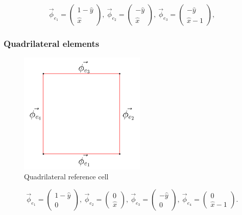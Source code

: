 \documentclass[14pt]{extarticle}
\numberwithin{equation}{section}    %
\newcommand{\phiv}{\vec \phi}
\begin{document}
\begin{equation}\label{eq:BasisFuncsTets}
    \phiv_{e_1} = \begin{pmatrix}
        1-\hat y\\ \hat x
    \end{pmatrix}, \  \phiv_{e_2} = \begin{pmatrix}
        -\hat y \\ \hat x
    \end{pmatrix}, \ \phiv_{e_3} = \begin{pmatrix}
        -\hat y\\ \hat x-1
    \end{pmatrix},
\end{equation}

\subsubsection{Quadrilateral elements}


\begin{figure}[h!]
\centering
\includegraphics[width=6cm]{GridFigure/basisFuncsQuads}
\caption{Quadrilateral reference cell}
\label{fig:quadBasis}
\end{figure}

\begin{equation}\label{eq:BasisFuncsQuads}
    \phiv_{e_1} = \begin{pmatrix}
        1-\hat y\\0
    \end{pmatrix}, \  \phiv_{e_2} = \begin{pmatrix}
        0\\ \hat x
    \end{pmatrix}, \ \phiv_{e_3} = \begin{pmatrix}
        -\hat y\\0
    \end{pmatrix}, \  \phiv_{e_4} = \begin{pmatrix}
        0\\ \hat x-1
    \end{pmatrix}.
\end{equation}
\end{document}

